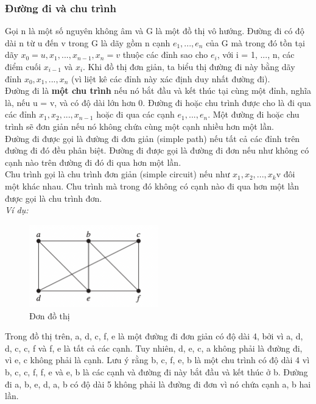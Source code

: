 \subsubsection{Đường đi và chu trình}
Gọi n là một số nguyên không âm và G là một đồ thị vô hướng. 
Đường đi có độ dài n từ u đến v trong G là dãy gồm n cạnh $e_1, ..., e_n$ của G mà trong đó tồn tại dãy $x_0 = u, x_1, ..., x_{n-1}, x_n = v$ thuộc các đỉnh sao cho $e_i$, với i = 1, ..., n, các điểm cuối $x_{i-1}$ và $x_i$. 
Khi đồ thị đơn giản, ta biểu thị đường đi này bằng dãy đỉnh $x_0, x_1, ..., x_n$ (vì liệt kê các đỉnh này xác định duy nhất đường đi).\\
Đường đi là \textbf{một chu trình} nếu nó bắt đầu và kết thúc tại cùng một đỉnh, nghĩa là, nếu u = v, và có độ dài lớn hơn 0. Đường đi hoặc chu trình được cho là đi qua các đỉnh $x_1, x_2, ..., x_{n-1}$ hoặc đi qua các cạnh $e_1, ..., e_n$. Một đường đi hoặc chu trình sẽ đơn giản nếu nó không chứa cùng một cạnh nhiều hơn một lần.\\
Đường đi được gọi là đường đi đơn giản (simple path) nếu tất cả các đỉnh trên đường đi đó đều phân biệt. Đường đi được gọi là đường đi đơn nếu như không có cạnh nào trên đường đi đó đi qua hơn một lần.\\
Chu trình gọi là chu trình đơn giản (simple circuit) nếu như {$x_1, x_2,..., x_k$}v đôi một khác nhau. Chu trình mà trong đó không có cạnh nào đi qua hơn một lần được gọi là chu trình đơn.\\
\textit{Ví dụ:}\\
\begin{figure}[H] %
    \centering %
    \includegraphics[width=0.5\textwidth]{assets/duongdi_dongian.png} 
    \caption{Đơn đồ thị} %
\end{figure}
Trong đồ thị trên, a, d, c, f, e là một đường đi đơn giản có độ dài 4, bởi vì {a, d}, {d, c}, {c, f} và {f, e } là tất cả các cạnh. Tuy nhiên, d, e, c, a không phải là đường đi, vì {e, c} không phải là cạnh. Lưu ý rằng b, c, f, e, b là một chu trình có độ dài 4 vì {b, c}, {c, f}, {f, e} và {e, b} là các cạnh và đường đi này bắt đầu và kết thúc ở b. Đường đi a, b, e, d, a, b có độ dài 5 không phải là đường đi đơn vì nó chứa cạnh {a, b} hai lần.
